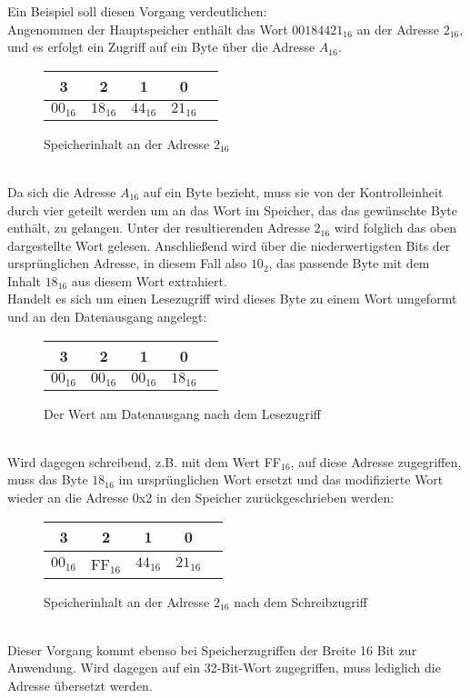 Ein Beispiel soll diesen Vorgang verdeutlichen:\\
Angenommen der Hauptspeicher enthält das Wort $00184421_{16}$ an der Adresse $2_{16}$,
und es erfolgt ein Zugriff auf ein Byte über die Adresse $A_{16}$.
\begin{figure} [htpb]
    \centering
        \begin{tabular}{|c|c|c|c|c|}
            \multicolumn{1}{c}{3} & \multicolumn{1}{c}{2} &  \multicolumn{1}{c}{1}& \multicolumn{1}{c}{0}\\
            \hline
            $00_{16}$ & $18_{16}$ & $44_{16}$ & $21_{16}$\\
            \hline
        \end{tabular}
        \caption{Speicherinhalt an der Adresse $2_{16}$}
\end{figure}
\\                                                        
Da sich die Adresse $A_{16}$ auf ein Byte bezieht, muss sie von der Kontrolleinheit durch vier geteilt werden um an das Wort im Speicher, das das gewünschte Byte enthält, zu gelangen.
Unter der resultierenden Adresse $2_{16}$ wird folglich das oben dargestellte Wort gelesen.
Anschließend wird über die niederwertigsten Bits der ursprünglichen Adresse, in diesem Fall also $10_2$, das passende Byte mit dem Inhalt $18_{16}$ aus diesem Wort extrahiert.\\
Handelt es sich um einen Lesezugriff wird dieses Byte zu einem Wort umgeformt und an den Datenausgang angelegt:\\
\begin{figure} [htpb]
    \centering
        \begin{tabular}{|c|c|c|c|c|}
            \multicolumn{1}{c}{3} & \multicolumn{1}{c}{2} &  \multicolumn{1}{c}{1}& \multicolumn{1}{c}{0}\\
            \hline
            $00_{16}$ & $00_{16}$ & $00_{16}$ & $18_{16}$\\
            \hline
        \end{tabular}
        \caption{Der Wert am Datenausgang nach dem Lesezugriff}
\end{figure}\\
Wird dagegen schreibend, z.B. mit dem Wert FF$_{16}$,  auf diese Adresse zugegriffen, muss das Byte $18_{16}$ im ursprünglichen Wort ersetzt und das modifizierte Wort wieder an die Adresse 0x2 in den Speicher zurückgeschrieben werden:
\begin{figure} [htpb]
    \centering
        \begin{tabular}{|c|c|c|c|c|}
            \multicolumn{1}{c}{3} & \multicolumn{1}{c}{2} &  \multicolumn{1}{c}{1}& \multicolumn{1}{c}{0}\\
            \hline
            $00_{16}$ & FF$_{16}$ & $44_{16}$ & $21_{16}$\\
            \hline
        \end{tabular}
        \caption{Speicherinhalt an der Adresse $2_{16}$ nach dem Schreibzugriff}
\end{figure}\\
Dieser Vorgang kommt ebenso bei Speicherzugriffen der Breite 16 Bit zur Anwendung.
Wird dagegen auf ein 32-Bit-Wort zugegriffen, muss lediglich die Adresse übersetzt werden.



